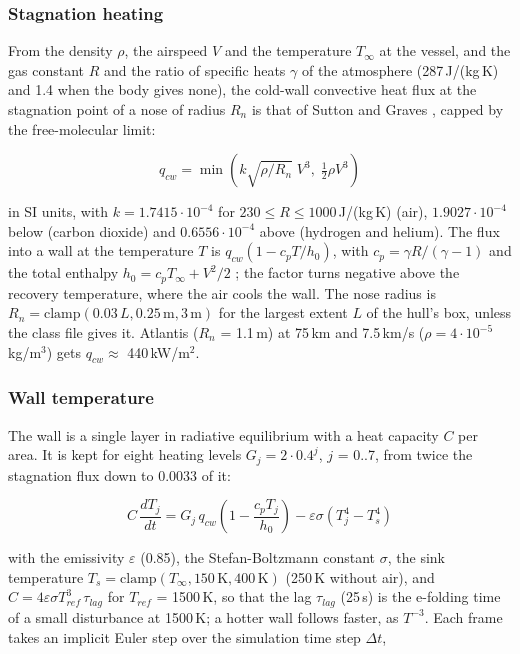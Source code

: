 \documentclass[Orbiter Technical Reference.tex]{subfiles}
\begin{document}
\begin{sloppypar}
\subsubsection{Stagnation heating}
From the density $\rho$, the airspeed $V$ and the temperature $T_{\infty}$ at the vessel, and the gas constant $R$ and the ratio of specific heats $\gamma$ of the atmosphere (287\,J/(kg\,K) and 1.4 when the body gives none), the cold-wall convective heat flux at the stagnation point of a nose of radius $R_{n}$ is that of Sutton and Graves \cite{sutton1971}, capped by the free-molecular limit:

\[ q_{cw} = \min\left(k\sqrt{\rho/R_{n}}\;V^{3},\; \tfrac{1}{2}\rho V^{3}\right) \]

\noindent
in SI units, with $k = 1.7415\cdot10^{-4}$ for $230 \le R \le 1000$\,J/(kg\,K) (air), $1.9027\cdot10^{-4}$ below (carbon dioxide) and $0.6556\cdot10^{-4}$ above (hydrogen and helium). The flux into a wall at the temperature $T$ is $q_{cw}(1 - c_{p}T/h_{0})$, with $c_{p} = \gamma R/(\gamma - 1)$ and the total enthalpy $h_{0} = c_{p}T_{\infty} + V^{2}/2$ \cite{anderson2006}; the factor turns negative above the recovery temperature, where the air cools the wall. The nose radius is $R_{n} = \mathrm{clamp}(0.03\,L, 0.25\,\mathrm{m}, 3\,\mathrm{m})$ for the largest extent $L$ of the hull's box, unless the class file gives it. Atlantis ($R_{n}$ = 1.1\,m) at 75\,km and 7.5\,km/s ($\rho = 4\cdot10^{-5}$\,kg/m$^{3}$) gets $q_{cw} \approx$ 440\,kW/m$^{2}$.

\subsubsection{Wall temperature}
The wall is a single layer in radiative equilibrium with a heat capacity $C$ per area. It is kept for eight heating levels $G_{j} = 2 \cdot 0.4^{j}$, $j$ = 0..7, from twice the stagnation flux down to 0.0033 of it:

\[ C\,\frac{dT_{j}}{dt} = G_{j}\,q_{cw}\left(1 - \frac{c_{p}T_{j}}{h_{0}}\right) - \varepsilon\sigma\left(T_{j}^{4} - T_{s}^{4}\right) \]

\noindent
with the emissivity $\varepsilon$ (0.85), the Stefan-Boltzmann constant $\sigma$, the sink temperature $T_{s} = \mathrm{clamp}(T_{\infty}, 150\,\mathrm{K}, 400\,\mathrm{K})$ (250\,K without air), and $C = 4\varepsilon\sigma T_{ref}^{3}\,\tau_{lag}$ for $T_{ref}$ = 1500\,K, so that the lag $\tau_{lag}$ (25\,s) is the e-folding time of a small disturbance at 1500\,K; a hotter wall follows faster, as $T^{-3}$. Each frame takes an implicit Euler step over the simulation time step $\Delta t$,


\end{sloppypar}
\end{document}
